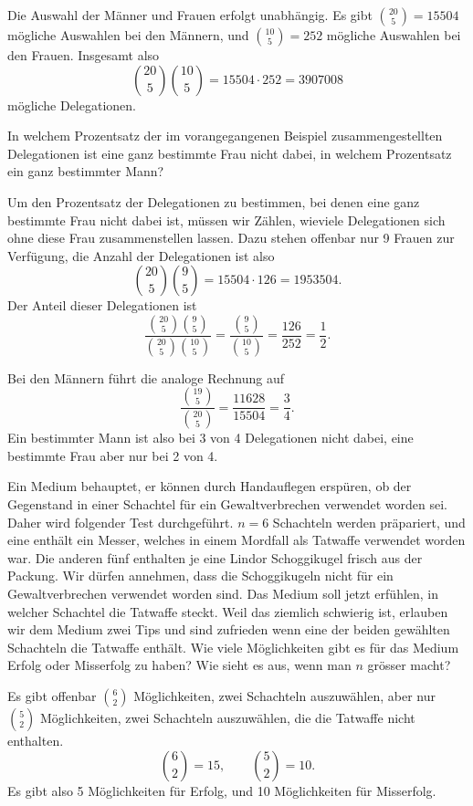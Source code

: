 \begin{beispiele}
\begin{loesung}
Die Auswahl der Männer und Frauen erfolgt unabhängig.
Es gibt
$\binom{20}{5}=15504$ mögliche Auswahlen bei den Männern,
und $\binom{10}{5}=252$ mögliche Auswahlen bei den Frauen.
Insgesamt also
\[
\binom{20}{5}\binom{10}{5}=15504\cdot 252 = 3907008
\]
mögliche Delegationen.
\end{loesung}

\item In welchem Prozentsatz der im vorangegangenen Beispiel
zusammengestellten Delegationen ist eine ganz bestimmte Frau
nicht dabei, in welchem Prozentsatz ein ganz bestimmter Mann?

\begin{loesung}
Um den Prozentsatz der Delegationen zu bestimmen, bei denen
eine ganz bestimmte Frau nicht dabei ist, müssen wir Zählen,
wieviele Delegationen sich ohne diese Frau zusammenstellen 
lassen.
Dazu stehen offenbar nur 9 Frauen zur Verfügung, die 
Anzahl der Delegationen ist also
\[
\binom{20}{5}\binom{9}{5}=15504\cdot 126 = 1953504.
\]
Der Anteil dieser Delegationen ist
\[
\frac{
\binom{20}{5}\binom{9}{5}
}{
\binom{20}{5}\binom{10}{5}
}
=
\frac{ \binom{9}{5} }{ \binom{10}{5} }
=
\frac{126}{252}=\frac12.
\]
\end{loesung}
Bei den Männern führt die analoge Rechnung auf
\[
\frac{\binom{19}{5}}{\binom{20}{5}}=\frac{11628}{15504}=\frac34.
\]
Ein bestimmter Mann ist also bei 3 von 4 Delegationen nicht dabei,
eine bestimmte Frau aber nur bei 2 von 4.
\item Ein Medium behauptet, er können durch Handauflegen erspüren, ob
der Gegenstand in einer Schachtel für ein Gewaltverbrechen verwendet
worden sei.
Daher wird folgender Test durchgeführt.
$n=6$
Schachteln werden präpariert, und eine enthält ein Messer,
welches in einem Mordfall als Tatwaffe verwendet worden war.
Die anderen fünf enthalten je eine Lindor Schoggikugel frisch aus der Packung.
Wir dürfen annehmen, dass die Schoggikugeln nicht für ein Gewaltverbrechen
verwendet worden sind.
Das Medium soll jetzt erfühlen, in welcher
Schachtel die Tatwaffe steckt.
Weil das ziemlich schwierig ist, erlauben
wir dem Medium zwei Tips und sind zufrieden wenn eine der beiden
gewählten Schachteln die Tatwaffe enthält.
Wie viele Möglichkeiten gibt
es für das Medium Erfolg oder Misserfolg zu haben?
Wie sieht es aus, wenn man $n$ grösser macht?

\begin{loesung}
Es gibt offenbar $\binom{6}{2}$ Möglichkeiten, zwei Schachteln auszuwählen,
aber nur $\binom{5}{2}$ Möglichkeiten, zwei Schachteln auszuwählen,
die die Tatwaffe nicht enthalten.
\[
\binom{6}{2}=15,\qquad\binom{5}{2}=10.
\]
Es gibt also 5 Möglichkeiten für Erfolg, und 10 Möglichkeiten
für Misserfolg.


\end{loesung}
\end{beispiele}
